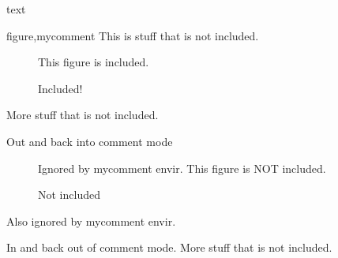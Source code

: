 \documentclass{article}
\begin{document}
text

\begin{xcomment}{figure,mycomment}
This is stuff that is not included.
\begin{figure}
This figure is included.
\caption{Included!}
\end{figure}
More stuff that is not included.
\begin{mycomment}
Out and back into comment mode
\begin{figure}
Ignored by mycomment envir.
This figure is NOT included.
\caption{Not included}
\end{figure}
Also ignored by mycomment envir.
\end{mycomment}
In and back out of comment mode.
More stuff that is not included.
\end{xcomment}
\end{document}
